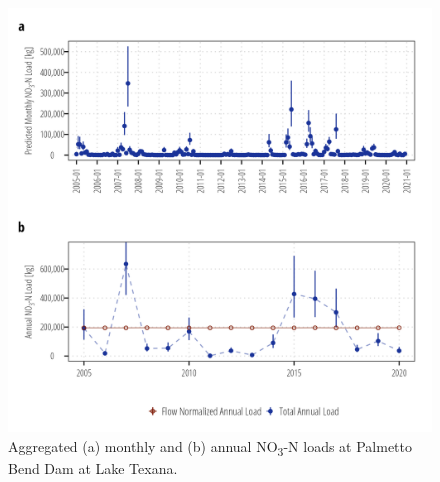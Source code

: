 \documentclass[
]{article}
\begin{document}
\begin{figure}[h]

{\centering \includegraphics{load_estimates_files/figure-pdf/no3_aggregate-texana-1.png}

}

\caption{Aggregated (a) monthly and (b) annual NO\textsubscript{3}-N
loads at Palmetto Bend Dam at Lake Texana.}

\end{figure}
\end{document}
